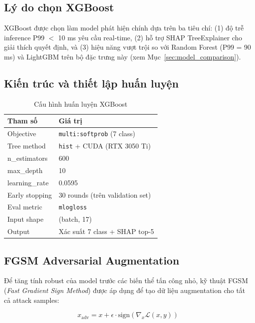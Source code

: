 \documentclass[12pt,a4paper]{article}
\begin{document}
\subsection{Lý do chọn XGBoost}

XGBoost được chọn làm model phát hiện chính dựa trên ba tiêu chí: (1) độ trễ inference P99 $<$ 10 ms yêu cầu real-time, (2) hỗ trợ SHAP TreeExplainer cho giải thích quyết định, và (3) hiệu năng vượt trội so với Random Forest (P99 = 90 ms) và LightGBM trên bộ đặc trưng này (xem Mục~\ref{sec:model_comparison}).

\subsection{Kiến trúc và thiết lập huấn luyện}

\begin{table}[H]
\centering
\caption{Cấu hình huấn luyện XGBoost}
\label{tab:xgb_config}
\begin{tabular}{ll}
\toprule
\textbf{Tham số} & \textbf{Giá trị} \\
\midrule
Objective         & \texttt{multi:softprob} (7 class) \\
Tree method       & \texttt{hist} + CUDA (RTX 3050 Ti) \\
n\_estimators     & 600 \\
max\_depth        & 10 \\
learning\_rate    & 0.0595 \\
Early stopping    & 30 rounds (trên validation set) \\
Eval metric       & \texttt{mlogloss} \\
Input shape       & (batch, 17) \\
Output            & Xác suất 7 class + SHAP top-5 \\
\bottomrule
\end{tabular}
\end{table}

\subsection{FGSM Adversarial Augmentation}

Để tăng tính robust của model trước các biến thể tấn công nhỏ, kỹ thuật FGSM (\textit{Fast Gradient Sign Method}) được áp dụng để tạo dữ liệu augmentation cho tất cả attack samples:

\[
x_{\text{adv}} = x + \epsilon \cdot \text{sign}(\nabla_x \mathcal{L}(x, y))
\]
\end{document}
